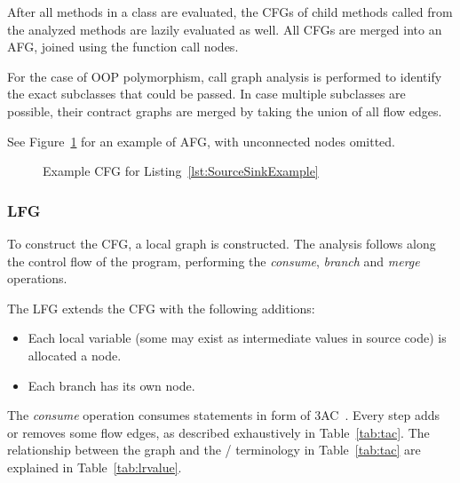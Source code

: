 After all methods in a class are evaluated,
the CFGs of child methods called from the analyzed methods
are lazily evaluated as well.
All CFGs are merged into an \ac{AFG},
joined using the function call nodes.

For the case of \ac{OOP} polymorphism,
call graph analysis is performed to identify
the exact subclasses that could be passed.
In case multiple subclasses are possible,
their contract graphs are merged by taking the union of all flow edges.

See Figure~\ref{fig:SourceSinkContract} for an example of \ac{AFG},
with unconnected nodes omitted.

\begin{figure}
	\caption{Example \ac{CFG} for Listing~\ref{lst:SourceSinkExample}}
	\begin{center}
	\end{center}
	\label{fig:SourceSinkContract}
\end{figure}

\subsubsection{\acf{LFG}}
To construct the \ac{CFG},
a local graph is constructed.
The analysis follows along the control flow of the program,
performing the \emph{consume}, \emph{branch} and \emph{merge} operations.

The \ac{LFG} extends the \ac{CFG} with the following additions:
\begin{itemize}
	\item Each local variable (some may exist as intermediate values in source code)
		is allocated a node.
	\item Each branch has its own  node.
\end{itemize}

The \emph{consume} operation consumes statements in form of \ac{3AC}~\cite{sootsurvivor}.
Every step adds or removes some flow edges,
as described exhaustively in Table~\ref{tab:tac}.
The relationship between the graph and the / terminology
in Table~\ref{tab:tac} are explained in Table~\ref{tab:lrvalue}.

